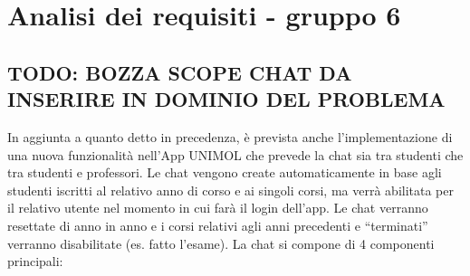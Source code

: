 
\chapter{Analisi dei requisiti - gruppo 6}
\label{ref:requisiti6}


\section{TODO: BOZZA SCOPE CHAT DA INSERIRE IN DOMINIO DEL PROBLEMA}\newline
In aggiunta a quanto detto in precedenza, è prevista anche l'implementazione di una nuova funzionalità nell’App UNIMOL che prevede la chat sia tra studenti che tra studenti e professori.
Le chat vengono create automaticamente in base agli studenti iscritti al relativo anno di corso e ai singoli corsi, ma verrà abilitata per il relativo utente nel momento in cui farà il login dell’app.
Le chat verranno resettate di anno in anno e i corsi relativi agli anni precedenti e “terminati” verranno disabilitate (es. fatto l’esame).\newline
La chat si compone di 4 componenti principali:

